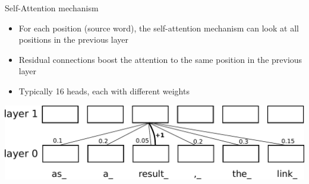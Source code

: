 \documentclass{beamer}
\begin{document}
\begin{frame}{Self-Attention mechanism}
    \begin{itemize}
         \item For each position (source word), the self-attention mechanism can look at all positions in the previous layer
         \item Residual connections boost the attention to the same position in the previous layer
         \item Typically 16 heads, each with different weights
    \end{itemize}
    \bigskip
    \begin{center}
        \includegraphics[scale=0.5]{attention.pdf}
    \end{center}
\end{frame}
\end{document}
